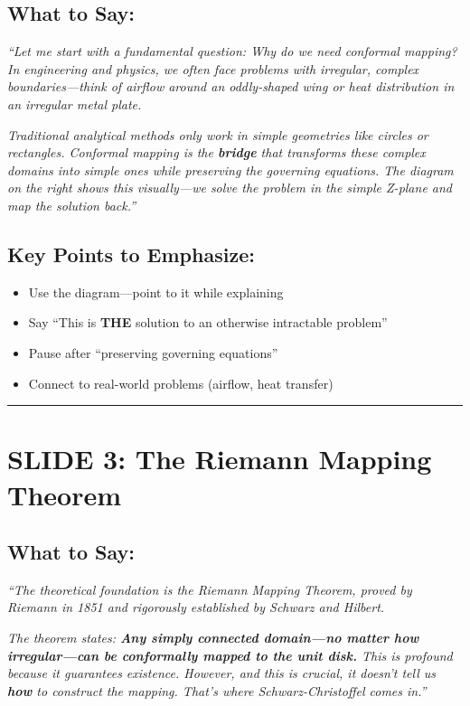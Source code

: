 \documentclass[12pt,a4paper]{article}
\begin{document}
\subsection*{What to Say:}
\begin{quotebox}
\large\textit{``Let me start with a fundamental question: Why do we need conformal mapping? In engineering and physics, we often face problems with irregular, complex boundaries---think of airflow around an oddly-shaped wing or heat distribution in an irregular metal plate.}

\textit{Traditional analytical methods only work in simple geometries like circles or rectangles. Conformal mapping is the \textbf{bridge} that transforms these complex domains into simple ones while preserving the governing equations. The diagram on the right shows this visually---we solve the problem in the simple Z-plane and map the solution back.''}
\end{quotebox}

\subsection*{Key Points to Emphasize:}
\begin{itemize}[leftmargin=*]
    \item Use the diagram---point to it while explaining
    \item Say ``This is \textbf{THE} solution to an otherwise intractable problem''
    \item Pause after ``preserving governing equations''
    \item Connect to real-world problems (airflow, heat transfer)
\end{itemize}

\vspace{10pt}
\hrule
\vspace{10pt}

\section*{SLIDE 3: The Riemann Mapping Theorem}

\subsection*{What to Say:}
\begin{quotebox}
\textit{``The theoretical foundation is the Riemann Mapping Theorem, proved by Riemann in 1851 and rigorously established by Schwarz and Hilbert.}

\textit{The theorem states: \textbf{Any simply connected domain---no matter how irregular---can be conformally mapped to the unit disk.} This is profound because it guarantees existence. However, and this is crucial, it doesn't tell us \textbf{how} to construct the mapping. That's where Schwarz-Christoffel comes in.''}
\end{quotebox}
\end{document}
